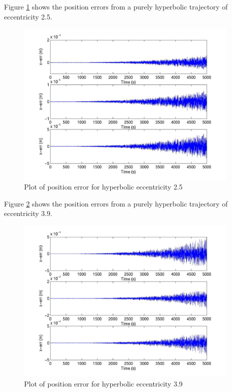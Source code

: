 \begin{description}
Figure \ref{hyp_mid_HM} shows the position errors from a purely hyperbolic
trajectory of eccentricity 2.5.

\begin{figure}[h]
\begin{center}
\includegraphics[height=80mm]{JPGfiles/pos_err_hyp_2p5_HM.jpg}
\caption{Plot of position error for hyperbolic eccentricity 2.5}
\label{hyp_mid_HM}
\end{center}
\end{figure}

Figure \ref{hyp_high_HM} shows the position errors from a purely hyperbolic
trajectory of eccentricity 3.9.

\begin{figure}[h]
\begin{center}
\includegraphics[height=80mm]{JPGfiles/pos_err_hyp_3p9_HM.jpg}
\caption{Plot of position error for hyperbolic eccentricity 3.9}
\label{hyp_high_HM}
\end{center}
\end{figure}


\end{description}
